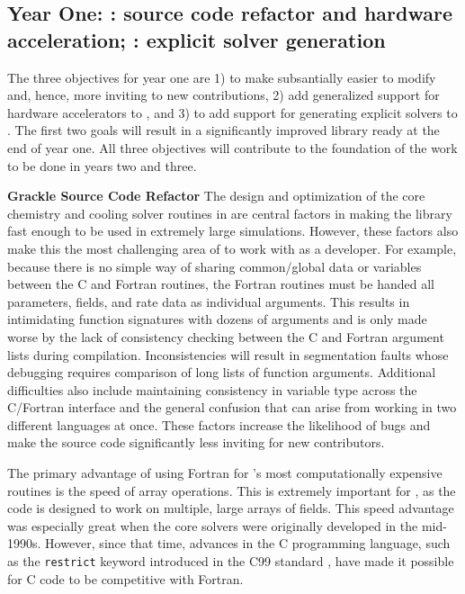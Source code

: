\subsection{Year One: \grackle{}: source code refactor and hardware
  acceleration; \dengo{}: explicit solver generation}

The three objectives for year one are 1) to make \grackle{} subsantially
easier to modify and, hence, more inviting to new contributions, 2)
add generalized support for hardware accelerators to \grackle{}, and
3) to add support for generating explicit solvers to \dengo{}.  The
first two goals will result in a significantly improved \grackle{}
library ready at the end of year one. All three objectives will
contribute to the foundation of the work to be done in years two and
three.

\noindent \textbf{Grackle Source Code Refactor}
The design and optimization of the core chemistry and cooling solver
routines in \grackle{} are central factors in making the library fast
enough to be used in extremely large simulations.  However, these
factors also make this the most challenging area of \grackle{} to
work with as a developer.  For example, because there is no simple way
of sharing common/global data or variables between the C and Fortran
routines, the Fortran routines must be handed all parameters, fields,
and rate data as individual arguments.  This results in intimidating
function signatures with dozens of arguments and is only made worse by
the lack of consistency checking between the C and Fortran argument
lists during compilation.  Inconsistencies will result in segmentation
faults whose debugging requires comparison of long lists of function
arguments.  Additional difficulties also include maintaining
consistency in variable type across the C/Fortran interface and the
general confusion that can arise from working in two different
languages at once.  These factors increase the likelihood of bugs and
make the source code significantly less inviting for new
contributors.

The primary advantage of using Fortran for \grackle{}'s most
computationally expensive routines is the speed of array operations.
This is extremely important for \grackle{}, as the code is designed to
work on multiple, large arrays of fields.  This speed advantage was
especially great when the core solvers were originally developed in
the mid-1990s.  However, since that time, advances in the C
programming language, such as the \texttt{restrict} keyword introduced
in the C99 standard \citep{c99}, have made it possible for C code to
be competitive with Fortran.


